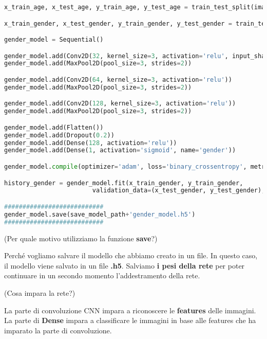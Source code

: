 \begin{lstlisting}[language=Python, caption=Modello]
x_train_age, x_test_age, y_train_age, y_test_age = train_test_split(images, age, random_state=42)

x_train_gender, x_test_gender, y_train_gender, y_test_gender = train_test_split(balanced_images, balanced_gender, random_state=42)

gender_model = Sequential()

gender_model.add(Conv2D(32, kernel_size=3, activation='relu', input_shape=(img_size[0],img_size[1],3)))
gender_model.add(MaxPool2D(pool_size=3, strides=2))

gender_model.add(Conv2D(64, kernel_size=3, activation='relu'))
gender_model.add(MaxPool2D(pool_size=3, strides=2))

gender_model.add(Conv2D(128, kernel_size=3, activation='relu'))
gender_model.add(MaxPool2D(pool_size=3, strides=2))

gender_model.add(Flatten())
gender_model.add(Dropout(0.2))
gender_model.add(Dense(128, activation='relu'))
gender_model.add(Dense(1, activation='sigmoid', name='gender'))

gender_model.compile(optimizer='adam', loss='binary_crossentropy', metrics=['accuracy'])

history_gender = gender_model.fit(x_train_gender, y_train_gender,
                        validation_data=(x_test_gender, y_test_gender), epochs=10)

###########################
gender_model.save(save_model_path+'gender_model.h5')
###########################

\end{lstlisting}

\begin{domanda}(Per quale motivo utilizziamo la funzione \textbf{save}?)
\end{domanda}

Perché vogliamo salvare il modello che abbiamo creato in un file. In questo caso, il modello viene salvato
in un file \textbf{.h5}. Salviamo \textbf{i pesi della rete} per poter continuare in un secondo momento
l'addestramento della rete.

\begin{osservazione}(Cosa impara la rete?)
\end{osservazione}

La parte di convoluzione CNN impara a riconoscere le \textbf{features} delle immagini. La parte di
\textbf{Dense} impara a classificare le immagini in base alle features che ha imparato la parte di convoluzione.